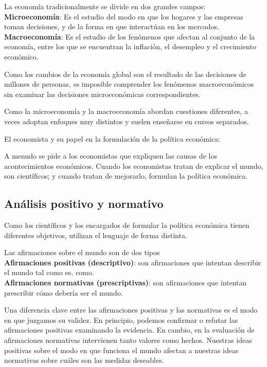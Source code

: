 \documentclass{report}
\begin{document}
La economía tradicionalmente se divide en dos grandes campos: \\
\textbf{Microeconomía}: Es el estudio del modo en que los hogares y las empresas toman decisiones, y de la forma en que interactúan en los mercados. \\
\textbf{Macroeconomía}: Es el estudio de los fenómenos que afectan al conjunto de la economía, entre los que se encuentran la inflación, el desempleo y el crecimiento económico.

Como los cambios de la economía global son el resultado de las decisiones de millones de personas, es imposible comprender los fenómenos macroeconómicos sin examinar las decisiones microeconómicas correspondientes. 

Como la microeconomía y la macroeconomía abordan cuestiones diferentes, a veces adoptan enfoques muy distintos y suelen enseñarse en cursos separados.

El economista y su papel en la formulación de la política económica:

A menudo se pide a los economistas que expliquen las causas de los acontecimientos económicos. Cuando los economistas tratan de explicar el mundo, son científicos; y cuando tratan de mejorarlo, formulan la política económica.

\subsection{Análisis positivo y normativo}
Como los científicos y los encargados de formular la política económica tienen diferentes objetivos, utilizan el lenguaje de forma distinta.

Las afirmaciones sobre el mundo son de dos tipos \\
\textbf{Afirmaciones positivas (descriptivo)}: son afirmaciones que intentan describir el mundo tal como es, como. \\
\textbf{Afirmaciones normativas (prescriptivas)}: son afirmaciones que intentan prescribir cómo debería ser el mundo.

Una diferencia clave entre las afirmaciones positivas y las normativas es el modo en que juzgamos su validez. En principio, podemos confirmar o refutar las afirmaciones positivas examinando la evidencia. En cambio, en la evaluación de afirmaciones normativas intervienen tanto valores como hechos. 	Nuestras ideas positivas sobre el modo en que funciona el mundo afectan a nuestras ideas normativas sobre cuáles son las medidas deseables.
\end{document}
